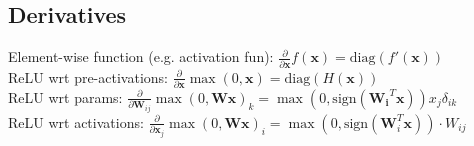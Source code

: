 \subsection*{Derivatives}
Element-wise function (e.g. activation fun): $\frac{\partial}{\partial \mathbf x}f(\mathbf x)=\text{diag}(f'(\mathbf x))$\\
ReLU wrt pre-activations: $\frac{\partial}{\partial \mathbf x}\max(0,\mathbf x)=\text{diag}(H(\mathbf x))$\\
ReLU wrt params: $\frac{\partial}{\partial \mathbf W_{ij}}\max(0,\mathbf{Wx})_k=\max(0,\text{sign}(\mathbf{W_i}^T\mathbf x))x_j\delta_{ik}$\\
ReLU wrt activations: $\frac{\partial}{\partial \mathbf x_j}\max(0,\mathbf{Wx})_i=\max(0,\text{sign}(\mathbf W_i^T\mathbf x))\cdot W_{ij}$